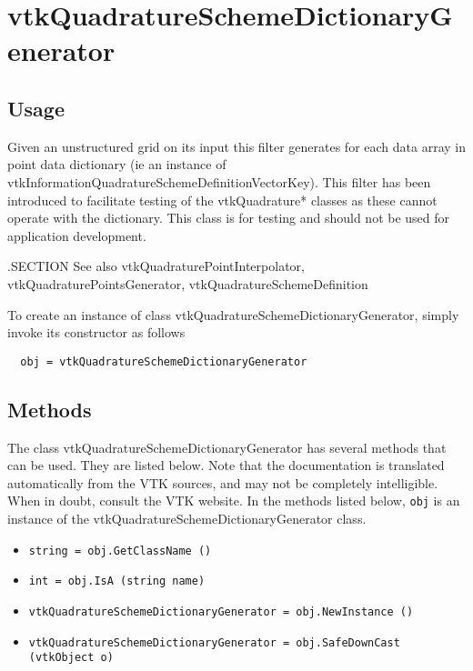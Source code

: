 \section{vtkQuadratureSchemeDictionaryGenerator}

\subsection{Usage}


 Given an unstructured grid on its input this filter generates
 for each data array in point data dictionary (ie an instance of 
 vtkInformationQuadratureSchemeDefinitionVectorKey). This filter 
 has been introduced to facilitate testing of the vtkQuadrature* 
 classes as these cannot operate with the dictionary. This class
 is for testing and should not be used for application development.

 .SECTION See also
 vtkQuadraturePointInterpolator, vtkQuadraturePointsGenerator, vtkQuadratureSchemeDefinition

To create an instance of class vtkQuadratureSchemeDictionaryGenerator, simply
invoke its constructor as follows
\begin{verbatim}
  obj = vtkQuadratureSchemeDictionaryGenerator
\end{verbatim}
\subsection{Methods}

The class vtkQuadratureSchemeDictionaryGenerator has several methods that can be used.
  They are listed below.
Note that the documentation is translated automatically from the VTK sources,
and may not be completely intelligible.  When in doubt, consult the VTK website.
In the methods listed below, \verb|obj| is an instance of the vtkQuadratureSchemeDictionaryGenerator class.
\begin{itemize}
\item  \verb|string = obj.GetClassName ()|

\item  \verb|int = obj.IsA (string name)|

\item  \verb|vtkQuadratureSchemeDictionaryGenerator = obj.NewInstance ()|

\item  \verb|vtkQuadratureSchemeDictionaryGenerator = obj.SafeDownCast (vtkObject o)|

\end{itemize}
